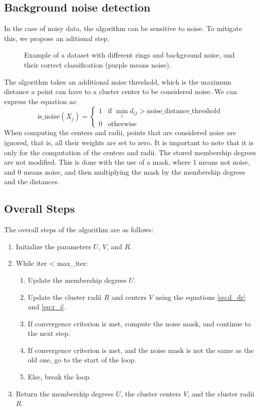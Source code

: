 \documentclass[conference]{IEEEtran}
\begin{document}
\subsection{Background noise detection}
In the case of noisy data, the algorithm can be sensitive to noise. To mitigate this, we propose an aditional step.
\begin{figure}[H]
    \centering
    \resizebox{0.9\linewidth}{!}{}
    \label{fig:noisy_bg}
    \caption{Example of a dataset with different rings and background noise, and their correct classification (purple means noise).}
\end{figure}
The algorithm takes an additional noise threshold, which is the maximum distance a point can have to a cluster center to be considered noise.
We can express the equation as:
\begin{equation}
    \text{is\_noise}(X_j) = \begin{cases}
        1 & \text{if } \min_{i} d_{ij} > \text{noise\_distance\_threshold} \\
        0 & \text{otherwise}
    \end{cases}
\end{equation}
When computing the centers and radii, points that are considered noise are ignored, that is, all their weights are set to zero.
It is important to note that it is only for the computation of the centers and radii. The stored membership degrees are not modified.
This is done with the use of a mask, where 1 means not noise, and 0 means noise, and then multiplying the mask by the membership degrees and the distances.


\subsection{Overall Steps}
The overall steps of the algorithm are as follows:
\begin{enumerate}
    \item Initialize the parameters $U$, $V$, and $R$.
    \item While iter < max\_iter:
    \begin{enumerate}
        \item Update the membership degrees $U$.
        \item Update the cluster radii $R$ and centers $V$ using the equations \eqref{eq:d_dr} and \eqref{eq:r_i}.
        \item If convergence criterion is met, compute the noise mask, and continue to the next step.
        \item If convergence criterion is met, and the noise mask is not the same as the old one, go to the start of the loop.
        \item Else, break the loop.
    \end{enumerate}
    \item Return the membership degrees $U$, the cluster centers $V$, and the cluster radii $R$.
\end{enumerate}
\end{document}
